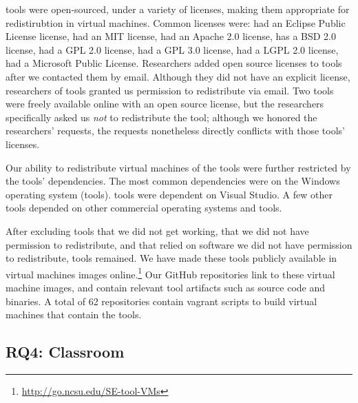 \documentclass[10pt,conference]{IEEEtran}
\begin{document}
\redistPermissionArtifact tools were open-sourced, 
under a variety of licenses, making them appropriate
for redistirubtion in virtual machines.
Common licenses were:
\licenseEPL had an Eclipse Public License license,
\licenseMIT had an MIT license,
\licenseApache had an Apache 2.0 license,
\licenseBSD has a BSD 2.0 license,
\licenseGPL had a GPL 2.0 license,
\licenseGPLThree had a GPL 3.0 license,
\licenseLGPL had a LGPL 2.0 license,
\licenseMPL had a Microsoft Public License.
Researchers added open source licenses to \contactOSSed tools
after we contacted them by email.	
Although they did not have an explicit license,
researchers of \redistPermissionEmail tools granted us
permission to redistribute via email.
Two tools were freely available online
with an open source license, but the researchers
specifically asked us \emph{not} to redistribute the
tool; although we honored the researchers' requests,
the requests nonetheless directly conflicts
with those tools' licenses.  

Our ability to redistribute virtual machines of the tools were
further restricted by the tools' dependencies.
The most common dependencies were on the Windows 
operating system (\depWindows tools).
\depVS tools were dependent on Visual Studio.
A few other tools depended on other commercial 
operating systems and tools.
 
After excluding tools 
that we did not get working,
that we did not have permission to redistribute, and 
that relied on software we did not have permission to redistribute,
\permissionToRedistribute tools remained.
We have made these tools publicly available in virtual machines 
images online.\footnote{\url{http://go.ncsu.edu/SE-tool-VMs}}
Our GitHub repositories link to these virtual machine images,
and contain relevant tool artifacts such as source code
and binaries.
A total of 62 repositories 
contain vagrant scripts to build 
virtual machines that contain the tools. 

\subsection{RQ4: Classroom}
\end{document}
